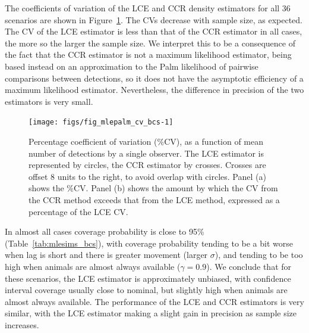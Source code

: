 \documentclass[useAMS, usenatbib, referee]{biom}\usepackage[]{graphicx}\usepackage[]{color}
\newenvironment{knitrout}{}{} %
\begin{document}
The coefficients of variation of the LCE and CCR density estimators for all 36 scenarios are shown in Figure~\ref{fig:fig_mlepalm_cv_bcs}. The CVs decrease with sample size, as expected. The CV of the LCE estimator is less than that of the CCR estimator in all cases, the more so the larger the sample size. We interpret this to be a consequence of the fact that the CCR estimator is not a maximum likelihood estimator, being based instead on an approximation to the Palm likelihood of pairwise comparisons between detections, so it does not have the asymptotic efficiency of a maximum likelihood estimator. Nevertheless, the difference in precision of the two estimators is very small.



\begin{knitrout}
\color{fgcolor}\begin{figure}

{\centering \texttt{[image: figs/fig\_mlepalm\_cv\_bcs-1]} 

}

\caption[Percentage coefficient of variation (\%CV), as a function of mean number of detections by a single observer]{Percentage coefficient of variation (\%CV), as a function of mean number of detections by a single observer. The LCE estimator is represented by circles, the CCR estimator by crosses. Crosses are offset 8 units to the right, to avoid overlap with circles. Panel (a) shows the \%CV. Panel (b) shows the amount by which the CV from the CCR method exceeds that from the LCE method, expressed as a percentage of the LCE CV.}\label{fig:fig_mlepalm_cv_bcs}
\end{figure}


\end{knitrout}


In almost all cases coverage probability is close to 95\% (Table~\ref{tab:mlesims_bcs}), with coverage probability tending to be a bit worse when lag is short and there is greater movement (larger $\sigma$), and tending to be too high when animals are almost always available ($\gamma=0.9$). We conclude that for these scenarios, the LCE estimator is approximately unbiased, with confidence interval coverage usually close to nominal, but slightly high when animals are almost always available. The performance of the LCE and CCR estimators is very similar, with the LCE estimator making a slight gain in precision as sample size increases.
\end{document}

